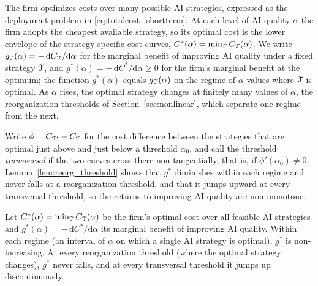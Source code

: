 The firm optimizes costs over many possible AI strategies, expressed as the deployment problem in \eqref{eq:totalcost_shortterm}.
At each level of AI quality $\alpha$ the firm adopts the cheapest available strategy, so its optimal cost is the lower envelope of the strategy-specific cost curves, $C^*(\alpha) = \min_{\mathcal{T}} C_{\mathcal{T}}(\alpha)$.
We write $g_{\mathcal{T}}(\alpha) = -\,\mathrm{d}C_{\mathcal{T}}/\mathrm{d}\alpha$ for the marginal benefit of improving AI quality under a fixed strategy $\mathcal{T}$, and $g^*(\alpha) = -\,\mathrm{d}C^*/\mathrm{d}\alpha \ge 0$ for the firm's marginal benefit at the optimum; the function $g^*(\alpha)$ equals $g_{\mathcal{T}}(\alpha)$ on the regime of $\alpha$ values where $\mathcal{T}$ is optimal.
As $\alpha$ rises, the optimal strategy changes at finitely many values of $\alpha$, the reorganization thresholds of Section~\ref{sec:nonlinear}, which separate one regime from the next.

Write $\phi = C_{\mathcal{T}'} - C_{\mathcal{T}}$ for the cost difference between the strategies that are optimal just above and just below a threshold $\alpha_0$, and call the threshold \emph{transversal} if the two curves cross there non-tangentially, that is, if $\phi'(\alpha_0) \neq 0$.
Lemma~\ref{lem:reorg_threshold} shows that $g^*$ diminishes within each regime and never falls at a reorganization threshold, and that it jumps upward at every transversal threshold, so the returns to improving AI quality are non-monotone.

\begin{lem}
\label{lem:reorg_threshold}
Let $C^*(\alpha) = \min_{\mathcal{T}} C_{\mathcal{T}}(\alpha)$ be the firm's optimal cost over all feasible AI strategies and $g^*(\alpha) = -\,\mathrm{d}C^*/\mathrm{d}\alpha$ its marginal benefit of improving AI quality.
Within each regime (an interval of $\alpha$ on which a single AI strategy is optimal), $g^*$ is non-increasing.
At every reorganization threshold (where the optimal strategy changes), $g^*$ never falls, and at every transversal threshold it jumps up discontinuously.
\end{lem}

